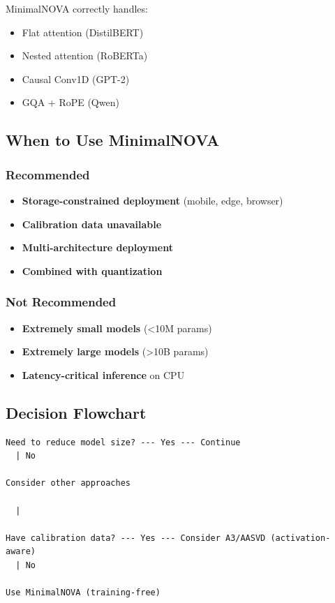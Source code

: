 MinimalNOVA correctly handles:
\begin{itemize}
\item Flat attention (DistilBERT)
\item Nested attention (RoBERTa)
\item Causal Conv1D (GPT-2)
\item GQA + RoPE (Qwen)

\end{itemize}
\subsection{When to Use MinimalNOVA}

\subsubsection{Recommended}

\begin{itemize}
\item \textbf{Storage-constrained deployment} (mobile, edge, browser)
\item \textbf{Calibration data unavailable}
\item \textbf{Multi-architecture deployment}
\item \textbf{Combined with quantization}

\end{itemize}
\subsubsection{Not Recommended}

\begin{itemize}
\item \textbf{Extremely small models} (\textless{}10M params)
\item \textbf{Extremely large models} (\textgreater{}10B params)
\item \textbf{Latency-critical inference} on CPU

\end{itemize}
\subsection{Decision Flowchart}

\begin{lstlisting}
Need to reduce model size? --- Yes --- Continue
  | No
   
Consider other approaches

  |
   
Have calibration data? --- Yes --- Consider A3/AASVD (activation-aware)
  | No
   
Use MinimalNOVA (training-free)
\end{lstlisting}

